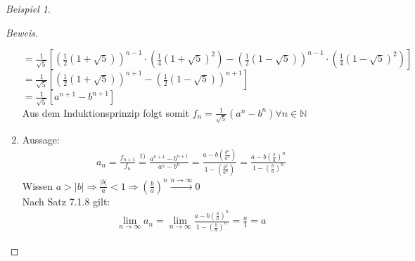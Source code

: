 \documentclass[12pt,a4paper,titlepage]{article} %
\theoremstyle{definition}
\theoremstyle{remark}
\newtheorem*{bsp}{Beispiel}
\newenvironment{bew}{\begin{proof}[Beweis]}{\end{proof}}
\newcommand{\N}{\mathbb{N}}
\newcommand{\limes}[1]{\lim\limits_{#1\rightarrow\infty}}
\begin{document}
\begin{bsp}
\begin{bew}
\begin{enumerate}
					\(= \frac{1}{\sqrt{5}}\left[\left(\frac{1}{2}\left(1 + \sqrt{5}\right)\right)^{n-1}\cdot\left(\frac{1}{4}\left(1+\sqrt{5}\right)^2\right) - \left(\frac{1}{2}\left(1 - \sqrt{5}\right)\right)^{n-1}\cdot\left(\frac{1}{4}\left(1 - \sqrt{5}\right)^2\right)\right]\)\\
					\(= \frac{1}{\sqrt{5}}\left[\left(\frac{1}{2}\left(1 + \sqrt{5}\right)\right)^{n+1} - \left(\frac{1}{2}\left(1 - \sqrt{5}\right)\right)^{n+1}\right]\)\\
					\(= \frac{1}{\sqrt{5}}\left[a^{n+1} - b^{n+1}\right]\)\\
					Aus dem Induktionsprinzip folgt somit \(f_n = \frac{1}{\sqrt{5}}\left(a^n-b^n\right) \forall n \in \N \)
				\item Aussage:\\
				\begin{align*}
					a_n = \frac{f_{n+1}}{f_n} \overset{\text{1)}}{=} \frac{a^{n+1} - b^{n+1}}{a^n - b^n} = \frac{a - b\left(\frac{b^n}{a^n}\right)}{1 - \left(\frac{b^n}{a^n}\right)} = \frac{a - b\left(\frac{b}{a}\right)^n}{1 - \left(\frac{b}{a}\right)^n}
				\end{align*}
				Wissen \(a > |b| \Rightarrow \frac{|b|}{a} < 1 \Rightarrow \left(\frac{b}{a}\right)^n \overset{n \rightarrow \infty}{\rightarrow} 0\)\\
				Nach Satz 7.1.8 gilt:
				\begin{align*}
					\limes{n} a_n = \limes{n} \frac{a - b\left(\frac{b}{a}\right)^n}{1 - \left(\frac{b}{a}\right)^n} = \frac{a}{1} = a
				\end{align*}
			\end{enumerate}
		\end{bew}
	\end{bsp}
\end{document}
